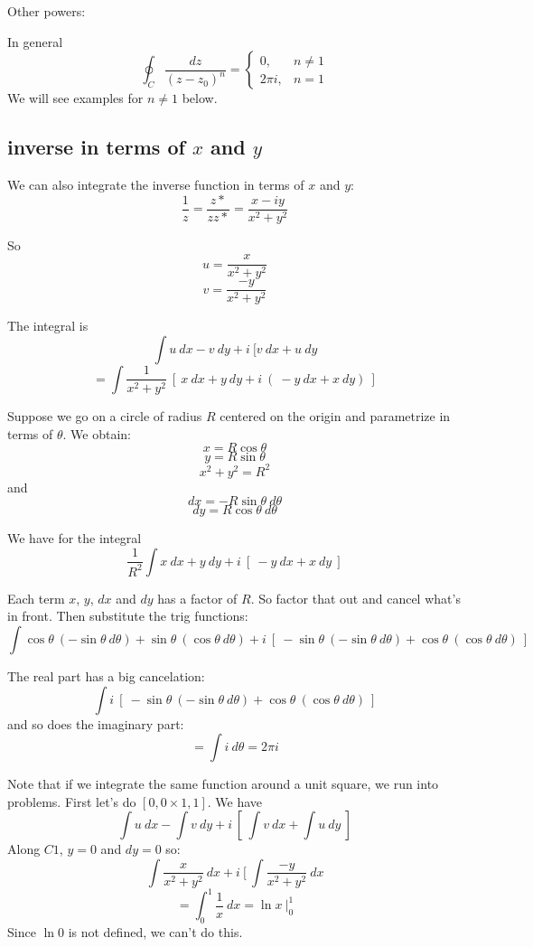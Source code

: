 \documentclass[11pt, oneside]{article}
\begin{document}
Other powers:

In general
\[ \oint_C \frac{dz}{(z - z_0)^n} = 
\begin{cases}
0, & n \ne 1 \\
2 \pi i, & n = 1 
\end {cases}
\]
We will see examples for $n \ne 1$ below.

\subsection*{inverse in terms of $x$ and $y$}

We can also integrate the inverse function in terms of $x$ and $y$:
\[ \frac{1}{z} = \frac{z*}{zz*} = \frac{x - iy}{x^2 + y^2} \]

So
\[ u = \frac{x}{x^2 + y^2} \]
\[ v =  \frac{-y}{x^2 + y^2} \]

The integral is
\[ \int u \ dx - v \ dy + i \ [ v \ dx + u \ dy \] 
\[ = \int \frac{1}{x^2+y^2} \ [ \  x \ dx + y \ dy + i \ ( \ -y \ dx + x \ dy) \ ] \]

Suppose we go on a circle of radius $R$ centered on the origin and parametrize in terms of $\theta$.  We obtain:
\[ x = R \cos \theta \]
\[ y = R \sin \theta \]
\[ x^2 + y^2 = R^2 \]
and
\[ dx = - R \sin \theta \ d \theta \]
\[ dy = R \cos \theta \ d \theta \]

We have for the integral
\[ \frac{1}{R^2} \int x \ dx + y \ dy + i \ [ \ -y \ dx + x \ dy \ ] \]

Each term $x$, $y$, $dx$ and $dy$ has a factor of $R$.  So factor that out and cancel what's in front.  Then substitute the trig functions:
\[ \int \cos \theta \ (- \sin \theta \ d \theta) + \sin \theta \ (\cos \theta \ d \theta) + i \ [ \ - \sin \theta \ (- \sin \theta \ d \theta) + \cos \theta \ (\cos \theta \ d \theta)\ ] \]

The real part has a big cancelation:
\[ \int   i \ [ \ - \sin \theta \ (- \sin \theta \ d \theta) + \cos \theta \ (\cos \theta \ d \theta)\ ]\]
and so does the imaginary part:
\[ = \int i \ d \theta = 2 \pi i \]

Note that if we integrate the same function around a unit square, we run into problems.  First let's  do $[0,0 \times 1,1]$.  We have
\[ \int u \ dx - \int v \ dy + i \ [ \ \int v \ dx + \int u \ dy \ ]  \]
Along $C1$, $y = 0$ and $dy = 0$ so:
\[ \int \frac{x}{x^2 + y^2} \ dx + i \ [ \ \int \frac{-y}{x^2 + y^2} \ dx \]
\[ = \int_0^1 \frac{1}{x} \ dx = \ln x \ \bigg |_0^1 \]
Since $\ln 0$ is not defined, we can't do this.
\end{document}
